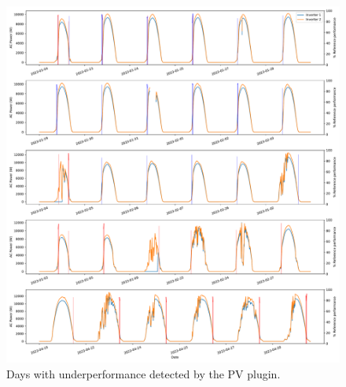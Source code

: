 \begin{figure}[hbtp]
    \centering
    \includegraphics[width=\textwidth]{figures/appendix/c_results/all_underperformance_detections.pdf}
    \caption{Days with underperformance detected by the PV plugin.}
    \label{fig:underperfdet}
\end{figure}
